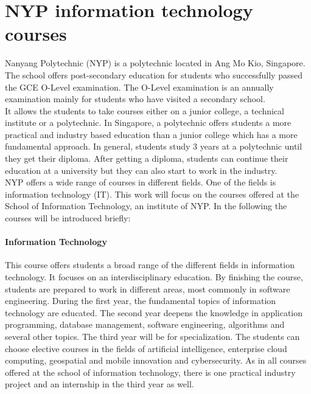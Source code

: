 \section{NYP information technology courses}
Nanyang Polytechnic (NYP) is a polytechnic located in Ang Mo Kio, Singapore. The school offers post-secondary education for students who successfully passed the GCE O-Level examination. The O-Level examination is an annually examination mainly for students who have visited a secondary school. \cite{aboutOLevel} \\ 
It allows the students to take courses either on a junior college, a technical institute or a polytechnic. In Singapore, a polytechnic offers students a more practical and industry based education than a junior college which has a more fundamental approach. In general, students study 3 years at a polytechnic until they get their diploma. After getting a diploma, students can continue their education at a university but they can also start to work in the industry. \cite{schoolSystem}\\
NYP offers a wide range of courses in different fields. One of the fields is information technology (IT). This work will focus on the courses offered at the School of Information Technology, an institute of NYP. In the following the courses will be introduced briefly: \cite{nypCourses}

\paragraph{Information Technology}
This course offers students a broad range of the different fields in information technology. It focuses on an interdisciplinary education. By finishing the course, students are prepared to work in different areas, most commonly in software engineering. During the first year, the fundamental topics of information technology are educated. The second year deepens the knowledge in application programming, database management, software engineering, algorithms and several other topics. The third year will be for specialization. The students can choose elective courses in the fields of artificial intelligence, enterprise cloud computing, geospatial and mobile innovation and cybersecurity. As in all courses offered at the school of information technology, there is one practical industry project and an internship in the third year as well.

